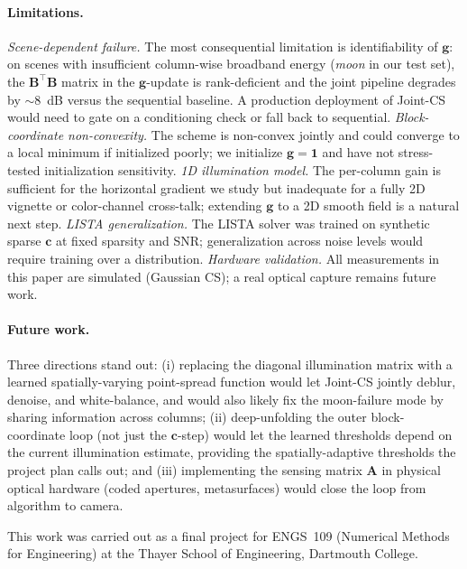 \documentclass{article}
\begin{document}
\paragraph{Limitations.} \emph{Scene-dependent failure.} The most consequential limitation is identifiability of $\boldsymbol{g}$: on scenes with insufficient column-wise broadband energy (\emph{moon} in our test set), the $\boldsymbol{B}^\top \boldsymbol{B}$ matrix in the $\boldsymbol{g}$-update is rank-deficient and the joint pipeline degrades by $\sim 8$~dB versus the sequential baseline. A production deployment of Joint-CS would need to gate on a conditioning check or fall back to sequential. \emph{Block-coordinate non-convexity.} The scheme is non-convex jointly and could converge to a local minimum if initialized poorly; we initialize $\boldsymbol{g}=\boldsymbol{1}$ and have not stress-tested initialization sensitivity. \emph{1D illumination model.} The per-column gain is sufficient for the horizontal gradient we study but inadequate for a fully 2D vignette or color-channel cross-talk; extending $\boldsymbol{g}$ to a 2D smooth field is a natural next step. \emph{LISTA generalization.} The LISTA solver was trained on synthetic sparse $\boldsymbol{c}$ at fixed sparsity and SNR; generalization across noise levels would require training over a distribution. \emph{Hardware validation.} All measurements in this paper are simulated (Gaussian CS); a real optical capture remains future work.

\paragraph{Future work.} Three directions stand out: (i) replacing the diagonal illumination matrix with a learned spatially-varying point-spread function would let Joint-CS jointly deblur, denoise, and white-balance, and would also likely fix the moon-failure mode by sharing information across columns; (ii) deep-unfolding the outer block-coordinate loop (not just the $\boldsymbol{c}$-step) would let the learned thresholds depend on the current illumination estimate, providing the spatially-adaptive thresholds the project plan calls out; and (iii) implementing the sensing matrix $\boldsymbol{A}$ in physical optical hardware (coded apertures, metasurfaces) would close the loop from algorithm to camera.


\begin{ack}
This work was carried out as a final project for ENGS~109 (Numerical Methods for Engineering) at the Thayer School of Engineering, Dartmouth College.
\end{ack}
\end{document}
